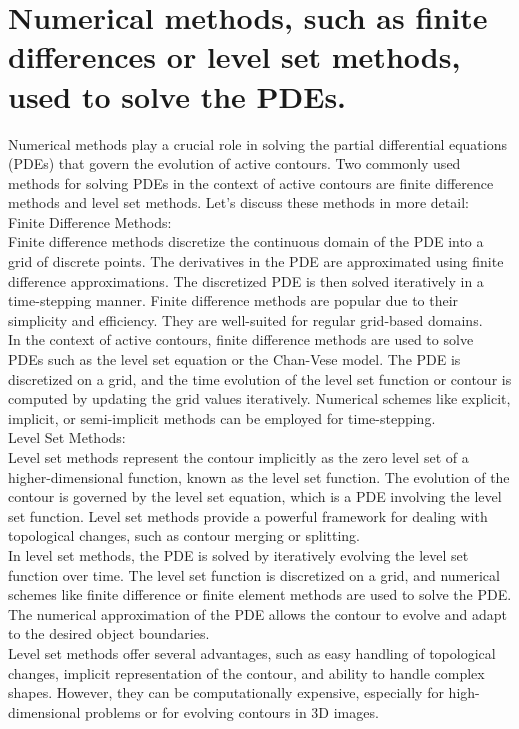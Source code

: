 \documentclass[]{report}
\begin{document}
\section*{Numerical methods, such as finite differences or level set methods, used to solve the PDEs.}
Numerical methods play a crucial role in solving the partial differential equations (PDEs) that govern the evolution of active contours. Two commonly used methods for solving PDEs in the context of active contours are finite difference methods and level set methods. Let's discuss these methods in more detail:\\

Finite Difference Methods:\\
Finite difference methods discretize the continuous domain of the PDE into a grid of discrete points. The derivatives in the PDE are approximated using finite difference approximations. The discretized PDE is then solved iteratively in a time-stepping manner. Finite difference methods are popular due to their simplicity and efficiency. They are well-suited for regular grid-based domains.\\
In the context of active contours, finite difference methods are used to solve PDEs such as the level set equation or the Chan-Vese model. The PDE is discretized on a grid, and the time evolution of the level set function or contour is computed by updating the grid values iteratively. Numerical schemes like explicit, implicit, or semi-implicit methods can be employed for time-stepping.\\

Level Set Methods:\\
Level set methods represent the contour implicitly as the zero level set of a higher-dimensional function, known as the level set function. The evolution of the contour is governed by the level set equation, which is a PDE involving the level set function. Level set methods provide a powerful framework for dealing with topological changes, such as contour merging or splitting.\\
In level set methods, the PDE is solved by iteratively evolving the level set function over time. The level set function is discretized on a grid, and numerical schemes like finite difference or finite element methods are used to solve the PDE. The numerical approximation of the PDE allows the contour to evolve and adapt to the desired object boundaries.\\

Level set methods offer several advantages, such as easy handling of topological changes, implicit representation of the contour, and ability to handle complex shapes. However, they can be computationally expensive, especially for high-dimensional problems or for evolving contours in 3D images.\\
\end{document}

